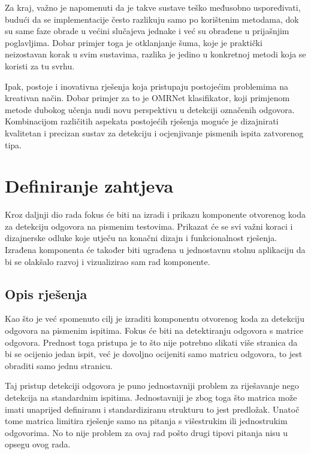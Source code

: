\documentclass{foi}
\begin{document}
Za kraj, važno je napomenuti da je takve sustave teško međusobno uspoređivati, budući da se implementacije često razlikuju samo po korištenim metodama, dok su same faze obrade u većini slučajeva jednake i već su obrađene u prijašnjim poglavljima. Dobar primjer toga je otklanjanje šuma, koje je praktički neizostavan korak u svim sustavima, razlika je jedino u konkretnoj metodi koja se koristi za tu svrhu.

Ipak, postoje i inovativna rješenja koja pristupaju postojećim problemima na kreativan način. Dobar primjer za to je OMRNet klasifikator, koji primjenom metode dubokog učenja nudi novu perspektivu u detekciji označenih odgovora. Kombinacijom različitih aspekata postojećih rješenja moguće je dizajnirati kvalitetan i precizan sustav za detekciju i ocjenjivanje pismenih ispita zatvorenog tipa.

\chapter{Definiranje zahtjeva}

Kroz daljnji dio rada fokus će biti na izradi i prikazu komponente otvorenog koda za detekciju odgovora na pismenim testovima. Prikazat će se svi važni koraci i dizajnerske odluke koje utječu na konačni dizajn i funkcionalnost rješenja. Izrađena komponenta će također biti ugrađena u jednostavnu stolnu aplikaciju da bi se olakšalo razvoj i vizualizirao sam rad komponente. 

\section{Opis rješenja}

Kao što je već spomenuto cilj je izraditi komponentu otvorenog koda za detekciju odgovora na pismenim ispitima. Fokus će biti na detektiranju odgovora s matrice odgovora. Prednost toga pristupa je to što nije potrebno slikati više stranica da bi se ocijenio jedan ispit, već je dovoljno ocijeniti samo matricu odgovora, to jest obraditi samo jednu stranicu. 

Taj pristup detekciji odgovora je puno jednostavniji problem za riješavanje nego detekcija na standardnim ispitima. Jednostavniji je zbog toga što matrica može imati unaprijed definiranu i standardiziranu strukturu to jest predložak. Unatoč tome matrica limitira rješenje samo na pitanja s višestrukim ili jednostrukim odgovorima. No to nije problem za ovaj rad pošto drugi tipovi pitanja nisu u opsegu ovog rada.
\end{document}
